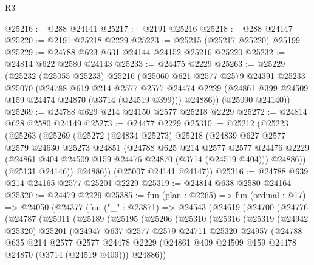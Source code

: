 \begin{lexlean}{R3}
\begin{coremodule}
@25216 := @288 @24141
@25217 := @2191 @25216
@25218 := @288 @24147
@25220 := @2191 @25218 @2229
@25223 := @25215 (@25217 @25220) @25199
@25229 := @24788 @623 @631 @24144 @24152 @25216 @25220
@25232 := @24814 @622 @2580 @24143
@25233 := @24475 @2229
@25263 := @25229
    (@25232
      (@25055 @25233)
      @25216
      (@25060
        @621
        @2577
        @2579
        @24391
        @25233
        @25070
        (@24788
          @619
          @214
          @2577
          @2577
          @24474
          @2229
          (@24861 @399 @24509 @159 @24474 @24870 (@3714 (@24519 @399)))
          @24886))
      (@25090 @24140))
@25269 := @24788 @629 @214 @24150 @2577 @25218 @2229
@25272 := @24814 @628 @2580 @24149
@25273 := @24477 @2229
@25310 := @25212
    (@25223
      (@25263
        (@25269
          (@25272
            (@24834 @25273)
            @25218
            (@24839
              @627
              @2577
              @2579
              @24630
              @25273
              @24851
              (@24788
                @625
                @214
                @2577
                @2577
                @24476
                @2229
                (@24861 @404 @24509 @159 @24476 @24870 (@3714 (@24519 @404)))
                @24886))
            (@25131 @24146))
          @24886))
      (@25007 @24141 @24147))
@25316 := @24788 @639 @214 @24165 @2577 @25201 @2229
@25319 := @24814 @638 @2580 @24164
@25320 := @24479 @2229
@25385 := fun (plan : @2265) =>
  fun (ordinal : @17) =>
  @24050
    (@24377
      (fun ("_" : @23871) =>
      @24543
        (@24619
          (@24700
            (@24776
              (@24787
                (@25011
                  (@25189
                    (@25195
                      (@25206
                        (@25310
                          (@25316
                            (@25319
                              (@24942 @25320)
                              @25201
                              (@24947
                                @637
                                @2577
                                @2579
                                @24711
                                @25320
                                @24957
                                (@24788
                                  @635
                                  @214
                                  @2577
                                  @2577
                                  @24478
                                  @2229
                                  (@24861 @409 @24509 @159 @24478 @24870 (@3714 (@24519 @409)))
                                  @24886))

\end{coremodule}
\end{lexlean}
